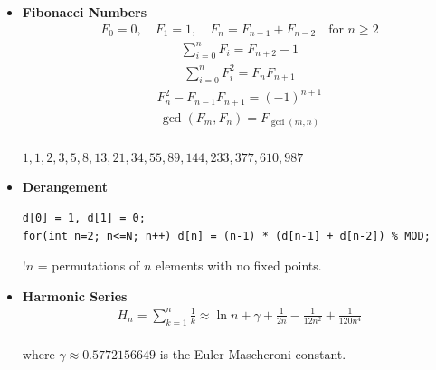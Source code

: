 \begin{itemize}
    \item \textbf{Fibonacci Numbers} \\
    \begin{equation*}
    \begin{aligned}
    F_0 = 0, \quad F_1 = 1, \quad F_n=F_{n-1} + F_{n-2} \quad \text{for } n \geq 2 
    \end{aligned}
    \end{equation*}
    \begin{equation*}
    \begin{aligned}
    \sum_{i=0}^nF_i = F_{n+2} - 1
    \end{aligned}
    \end{equation*}
    \begin{equation*}
    \begin{aligned}
    \sum_{i=0}^n F_i^2 = F_n F_{n+1}
    \end{aligned}
    \end{equation*}
    \begin{equation*}
    \begin{aligned}
    F_n^2 - F_{n-1}F_{n+1} = (-1)^{n+1}
    \end{aligned}
    \end{equation*}
    \begin{equation*}
    \begin{aligned}
    \gcd(F_m, F_n) = F_{\gcd(m, n)}
    \end{aligned}
    \end{equation*} \\ 
    $1, 1, 2, 3, 5, 8, 13, 21, 34, 55, 89, 144, 233, 377, 610, 987$

    \item \textbf{Derangement}
\begin{verbatim}
d[0] = 1, d[1] = 0;
for(int n=2; n<=N; n++) d[n] = (n-1) * (d[n-1] + d[n-2]) % MOD;
\end{verbatim}
    $!n$ = permutations of $n$ elements with no fixed points.

    \item \textbf{Harmonic Series} \\
    \begin{equation*}
    \begin{aligned}
    H_n = \sum_{k=1}^{n} \frac{1}{k} \approx \ln n + \gamma + \frac{1}{2n} - \frac{1}{12n^2} + \frac{1}{120n^4}
    \end{aligned}
    \end{equation*} \\ 
    where $\gamma \approx 0.5772156649$ is the Euler-Mascheroni constant.


\end{itemize}
